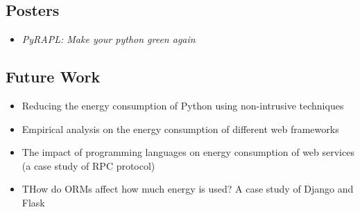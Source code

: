 \subsection*{Posters}
\begin{itemize}
    \item \emph{PyRAPL\@: Make your python green again}
\end{itemize}
\subsection*{Future Work}
\begin{itemize}
    \item Reducing the energy consumption of Python using non-intrusive techniques
    \item Empirical analysis on the energy consumption of different web frameworks
    \item The impact of programming languages on energy consumption of web services (a case study of RPC protocol)
    \item THow do ORMs affect how much energy is used? A case study of Django and Flask
\end{itemize}


\cleardoublepage
